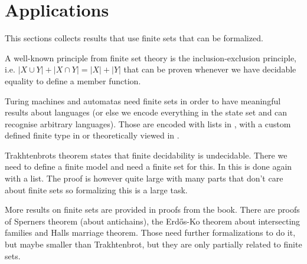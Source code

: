 \documentclass{article}
\begin{document}
\section{Applications}
This sections collects results that use finite sets that can be formalized.

A well-known principle from finite set theory is the inclusion-exclusion principle, i.e. $|X \cup Y| + |X \cap Y| = |X | + |Y|$ that can be proven whenever we have decidable equality to define a member function.

Turing machines and automatas need finite sets in order to have meaningful results about languages (or else we encode everything in the state set and can recognise arbitrary languages). Those are encoded with lists in \cite{turing-machines}, with a custom defined finite type in \cite{finType} or theoretically viewed in \cite{Constructive}.

Trakhtenbrots theorem states that finite decidability is undecidable. There we need to define a finite model and need a finite set for this. In \cite{formalTrakhtenbrot} this is done again with a list. The proof is however quite large with many parts that don't care about finite sets so formalizing this is a large task.

More results on finite sets are provided in proofs from the book\cite{proofBook}.  There are proofs of Sperners theorem (about antichains), the Erd\H{o}s-Ko theorem about intersecting families and Halls marriage theorem. Those need further formalizations to do it, but maybe smaller than Trakhtenbrot, but they are only partially related to finite sets.


\end{document}
